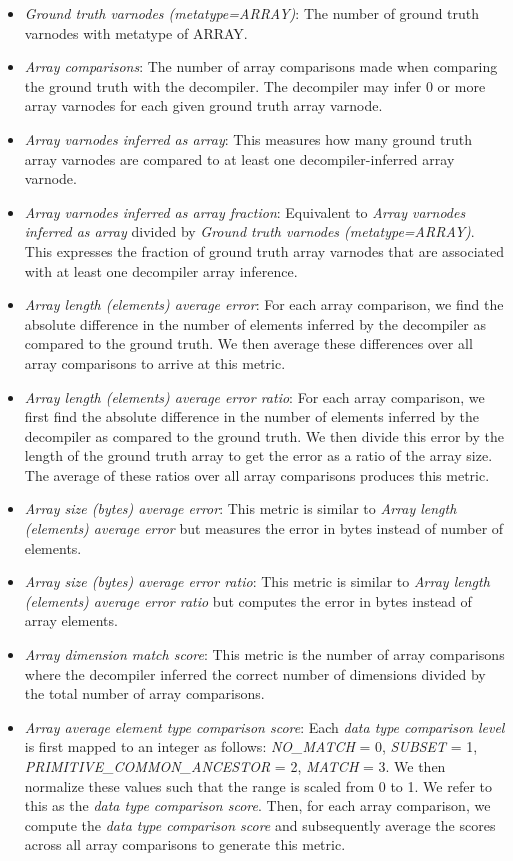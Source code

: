 \documentclass[a4paper,twoside]{article}
\begin{document}
\begin{itemize}
    \item \emph{Ground truth varnodes (metatype=ARRAY)}: The number of ground truth varnodes with metatype of ARRAY.
    \item \emph{Array comparisons}: The number of array comparisons made when comparing the ground truth with the decompiler. The decompiler may infer 0 or more array varnodes for each given ground truth array varnode.
    \item \emph{Array varnodes inferred as array}: This measures how many ground truth array varnodes are compared to at least one decompiler-inferred array varnode.
    \item \emph{Array varnodes inferred as array fraction}: Equivalent to \emph{Array varnodes inferred as array} divided by \emph{Ground truth varnodes (metatype=ARRAY)}. This expresses the fraction of ground truth array varnodes that are associated with at least one decompiler array inference.
    \item \emph{Array length (elements) average error}: For each array comparison, we find the absolute difference in the number of elements inferred by the decompiler as compared to the ground truth. We then average these differences over all array comparisons to arrive at this metric.
    \item \emph{Array length (elements) average error ratio}: For each array comparison, we first find the absolute difference in the number of elements inferred by the decompiler as compared to the ground truth. We then divide this error by the length of the ground truth array to get the error as a ratio of the array size. The average of these ratios over all array comparisons produces this metric.
    \item \emph{Array size (bytes) average error}: This metric is similar to \emph{Array length (elements) average error} but measures the error in bytes instead of number of elements.
    \item \emph{Array size (bytes) average error ratio}: This metric is similar to \emph{Array length (elements) average error ratio} but computes the error in bytes instead of array elements.
    \item \emph{Array dimension match score}: This metric is the number of array comparisons where the decompiler inferred the correct number of dimensions divided by the total number of array comparisons.
    \item \emph{Array average element type comparison score}: Each \emph{data type comparison level} is first mapped to an integer as follows: \emph{NO\_MATCH} = 0, \emph{SUBSET} = 1, \emph{PRIMITIVE\_COMMON\_ANCESTOR} = 2, \emph{MATCH} = 3. We then normalize these values such that the range is scaled from 0 to 1. We refer to this as the \emph{data type comparison score}. Then, for each array comparison, we compute the \emph{data type comparison score} and subsequently average the scores across all array comparisons to generate this metric.
\end{itemize}
\end{document}
